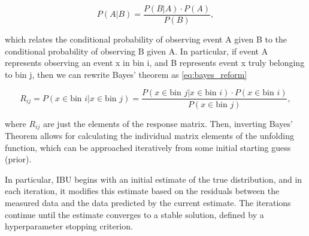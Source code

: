         \begin{equation}\label{eq:bayes}
            P(A|B) = \frac{P(B|A) \cdot P(A)}{P(B)},
        \end{equation}

        which relates the conditional probability of observing event A given B to the conditional probability of observing B given A. In particular, if event A represents observing an event x in bin i, and B represents event x truly belonging to bin j, then we can rewrite Bayes' theorem as \eqref{eq:bayes_reform}


        \begin{equation}\label{eq:bayes_reform}
            R_{ij} = P(x \in \text{bin } i| x \in \text{bin } j) = \frac{P(x \in \text{bin } j|x \in \text{bin } i) \cdot P(x \in \text{bin } i)}{P(x \in \text{bin } j)},
        \end{equation}


        where $R_{ij}$ are just the elements of the response matrix. Then, inverting Bayes' Theorem allows for calculating the individual matrix elements of the unfolding function, which can be approached iteratively from some initial starting guess (prior). 

        In particular, IBU begins with an initial estimate of the true distribution, and in each iteration, it modifies this estimate based on the residuals between the measured data and the data predicted by the current estimate. The iterations continue until the estimate converges to a stable solution, defined by a hyperparameter stopping criterion. 


        

